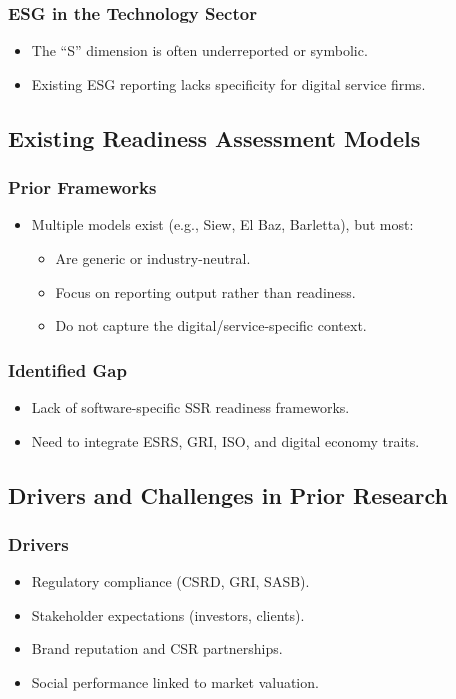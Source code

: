 \subsubsection{ESG in the Technology Sector}
\begin{itemize}
    \item The “S” dimension is often underreported or symbolic.
    \item Existing ESG reporting lacks specificity for digital service firms.
\end{itemize}

\subsection{Existing Readiness Assessment Models}
\subsubsection{Prior Frameworks}
\begin{itemize}
    \item Multiple models exist (e.g., Siew, El Baz, Barletta), but most:
    \begin{itemize}
        \item Are generic or industry-neutral.
        \item Focus on reporting output rather than readiness.
        \item Do not capture the digital/service-specific context.
    \end{itemize}
\end{itemize}

\subsubsection{Identified Gap}
\begin{itemize}
    \item Lack of software-specific SSR readiness frameworks.
    \item Need to integrate ESRS, GRI, ISO, and digital economy traits.
\end{itemize}

\subsection{Drivers and Challenges in Prior Research}
\subsubsection{Drivers}
\begin{itemize}
    \item Regulatory compliance (CSRD, GRI, SASB).
    \item Stakeholder expectations (investors, clients).
    \item Brand reputation and CSR partnerships.
    \item Social performance linked to market valuation.
\end{itemize}

